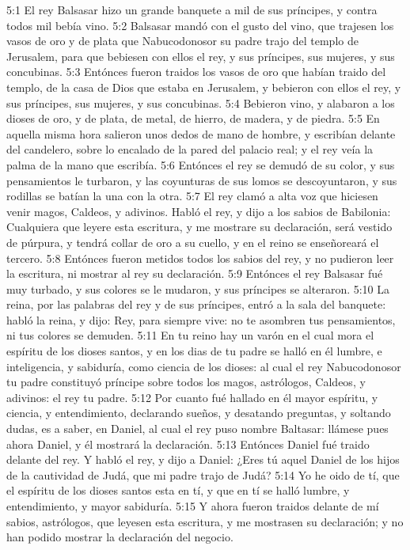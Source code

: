 5:1 El rey Balsasar hizo un grande banquete a mil de sus príncipes, y contra todos mil bebía vino.
5:2 Balsasar mandó con el gusto del vino, que trajesen los vasos de oro y de plata que Nabucodonosor su padre trajo del templo de Jerusalem, para que bebiesen con ellos el rey, y sus príncipes, sus mujeres, y sus concubinas.
5:3 Entónces fueron traidos los vasos de oro que habían traido del templo, de la casa de Dios que estaba en Jerusalem, y bebieron con ellos el rey, y sus príncipes, sus mujeres, y sus concubinas.
5:4 Bebieron vino, y alabaron a los dioses de oro, y de plata, de metal, de hierro, de madera, y de piedra.
5:5 En aquella misma hora salieron unos dedos de mano de hombre, y escribían delante del candelero, sobre lo encalado de la pared del palacio real; y el rey veía la palma de la mano que escribía.
5:6 Entónces el rey se demudó de su color, y sus pensamientos le turbaron, y las coyunturas de sus lomos se descoyuntaron, y sus rodillas se batían la una con la otra.
5:7 El rey clamó a alta voz que hiciesen venir magos, Caldeos, y adivinos. Habló el rey, y dijo a los sabios de Babilonia: Cualquiera que leyere esta escritura, y me mostrare su declaración, será vestido de púrpura, y tendrá collar de oro a su cuello, y en el reino se enseñoreará el tercero.
5:8 Entónces fueron metidos todos los sabios del rey, y no pudieron leer la escritura, ni mostrar al rey su declaración.
5:9 Entónces el rey Balsasar fué muy turbado, y sus colores se le mudaron, y sus príncipes se alteraron.
5:10 La reina, por las palabras del rey y de sus príncipes, entró a la sala del banquete: habló la reina, y dijo: Rey, para siempre vive: no te asombren tus pensamientos, ni tus colores se demuden.
5:11 En tu reino hay un varón en el cual mora el espíritu de los dioses santos, y en los dias de tu padre se halló en él lumbre, e inteligencia, y sabiduría, como ciencia de los dioses: al cual el rey Nabucodonosor tu padre constituyó príncipe sobre todos los magos, astrólogos, Caldeos, y adivinos: el rey tu padre.
5:12 Por cuanto fué hallado en él mayor espíritu, y ciencia, y entendimiento, declarando sueños, y desatando preguntas, y soltando dudas, es a saber, en Daniel, al cual el rey puso nombre Baltasar: llámese pues ahora Daniel, y él mostrará la declaración.
5:13 Entónces Daniel fué traido delante del rey. Y habló el rey, y dijo a Daniel: ¿Eres tú aquel Daniel de los hijos de la cautividad de Judá, que mi padre trajo de Judá?
5:14 Yo he oido de tí, que el espíritu de los dioses santos esta en tí, y que en tí se halló lumbre, y entendimiento, y mayor sabiduría.
5:15 Y ahora fueron traidos delante de mí sabios, astrólogos, que leyesen esta escritura, y me mostrasen su declaración; y no han podido mostrar la declaración del negocio.
